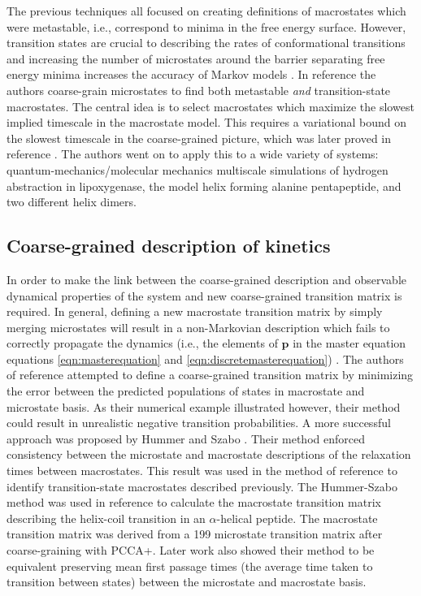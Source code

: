 The previous techniques all focused on creating definitions of macrostates which were metastable, i.e., correspond to minima in the free energy surface. However, transition states are crucial to describing the rates of conformational transitions and increasing the number of microstates around the barrier separating free energy minima increases the accuracy of Markov models \cite{prinzMarkovModelsMolecular2011}.  In reference \cite{martiniVariationalIdentificationMarkovian2017} the authors coarse-grain microstates to find both metastable \emph{and} transition-state macrostates. The central idea is to select macrostates which maximize the slowest implied timescale in the macrostate model. This requires a variational bound on the slowest timescale in the coarse-grained picture, which was later proved in reference \cite{kellsMeanFirstPassage2019}.  The authors went on to apply this to a wide variety of systems: quantum-mechanics/molecular mechanics multiscale simulations of hydrogen abstraction in lipoxygenase, the model helix forming  alanine pentapeptide, and two different helix dimers. 


\subsection{Coarse-grained description of kinetics}

In order to make the link between the coarse-grained description and observable dynamical properties of the system and new coarse-grained transition matrix is required.   In general, defining a new macrostate transition matrix by simply merging microstates will result in a non-Markovian description which fails to correctly propagate the dynamics (i.e.,  the elements of $\mathbf{p}$ in the master equation equations \ref{eqn:masterequation} and \ref{eqn:discretemasterequation}) \cite{kubeCoarseGrainingMethod2007b, noeProjectedHiddenMarkov2013a}. The authors of reference \cite{kubeCoarseGrainingMethod2007b} attempted to define a coarse-grained transition matrix by minimizing the error between the predicted populations of states in macrostate and microstate basis. As their numerical example illustrated however, their method could result in unrealistic negative transition probabilities.  A more successful approach was proposed by Hummer and Szabo  \cite{hummerOptimalDimensionalityReduction2015a}. Their method enforced consistency between the microstate and macrostate descriptions of the relaxation times between macrostates. This result was used in the method of reference \cite{martiniVariationalIdentificationMarkovian2017} to identify transition-state macrostates described previously. The Hummer-Szabo method was used in reference \cite{jasHelixCoilTransition2018} to calculate the macrostate transition matrix describing the helix-coil transition in an $\alpha$-helical peptide. The macrostate transition matrix was 
derived from a 199 microstate transition matrix after coarse-graining with PCCA+. Later work also showed \cite{kellsCorrelationFunctionsMean2020} their method to be equivalent preserving mean first passage times (the average time taken to transition between states) between the microstate and macrostate basis. 

